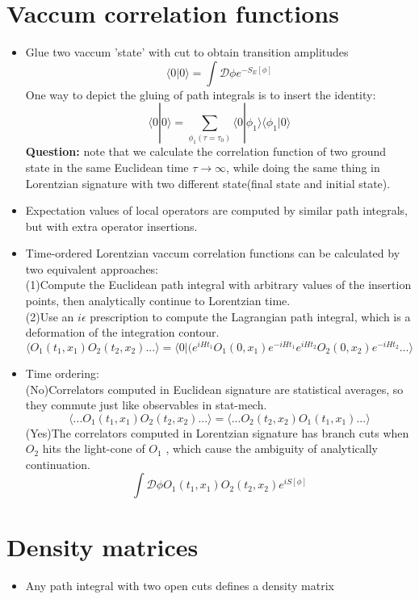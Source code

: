 \documentclass{article}
\def\beq{\begin{eqnarray}}
\def\eeq{\end{eqnarray}}
\def\beq{\begin{equation}}
\def\eeq{\end{equation}}
\begin{document}
\section{Vaccum correlation functions}
\begin{itemize}
\item{Glue two vaccum 'state' with cut to obtain transition amplitudes }
\beq
\langle 0|0\rangle =\int\mathcal{D}\phi e^{-S_{E}[\phi]}
\eeq
One way to depict the gluing of path integrals is to insert the identity:
\beq
\langle 0|0\rangle =\sum_{\phi_{1}(\tau=\tau_{0})}\langle 0|\phi_{1}\rangle\langle\phi_{1}|0\rangle
\eeq
 \textbf{Question:} note that we calculate the correlation function of two ground state in the same Euclidean time $\tau\rightarrow \infty$,
  while doing the same thing in Lorentzian signature with two different state(final state and initial state).
  \item{Expectation values of local operators are computed by similar path integrals, but with extra operator insertions.}
\item{Time-ordered Lorentzian vaccum correlation functions can be calculated by two equivalent approaches:\\
 (1)Compute the Euclidean path integral with arbitrary values of the insertion points, then analytically continue to Lorentzian time.\\
 (2)Use an $i\epsilon $ prescription to compute the Lagrangian path integral, which is a deformation of the integration contour. }
 \beq
 \langle
 O_{1}(t_{1},x_{1})O_{2}(t_{2},x_{2})...
 \rangle=\langle 0|(e^{iHt_{1}}
 O_{1}(0,x_{1})e^{-iHt_{1}}e^{iHt_{2}}O_{2}(0,x_{2})e^{-iHt_{2}}...
 \rangle
 \eeq
 \item{Time ordering:\\(No)Correlators computed in Euclidean signature are statistical averages, so they commute just like observables in stat-mech.
 \beq
      \langle...
 O_{1}(t_{1},x_{1})O_{2}(t_{2},x_{2})...
 \rangle= \langle
 ...O_{2}(t_{2},x_{2})O_{1}(t_{1},x_{1})...
 \rangle
     \eeq
      (Yes)The correlators computed in Lorentzian signature has branch cuts when $O_{2}$ hits the light-cone of $O_{1}$ , which cause the ambiguity of analytically continuation.
      \beq
      \int\mathcal{D}\phi O_{1}(t_{1},x_{1})O_{2}(t_{2},x_{2})e^{iS[\phi]}
     \eeq }
\end{itemize}
\section{Density matrices}
\begin{itemize}
\item{Any path integral with two open cuts defines a density matrix}
\end{itemize}
\end{document}
